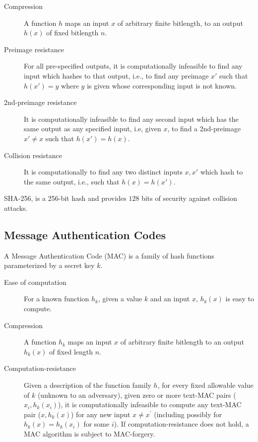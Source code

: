 \documentclass[%
  slidesonly,%
  semlayer%
  ]{seminar}                                  %
\begin{document}
\begin{slide}
    \begin{description}
      \item [Compression] A function $h$ maps an input $x$ of arbitrary finite bitlength, to an output $h(x)$ of fixed bitlength $n$.
      \item [Preimage resistance] For all pre-specified outputs, it is computationally infeasible to find any input which hashes to that output, i.e., to find any preimage $x'$ such that $h(x') = y$ where $y$ is given whose corresponding input is not known.
      \item [2nd-preimage resistance] It is computationally infeasible to find any second input which has the same output as any specified input, i.e, given $x$, to find a 2nd-preimage $x' \neq x$ such that $h(x') = h(x)$.
      \item [Collision resistance] It is computationally to find any two distinct inputs $x,x'$ which hash to the same output, i.e., such that $h(x) = h(x')$.
    \end{description}
    SHA-256, is a 256-bit hash and provides $128$ bits of security against collision attacks.
    \vfill
    \clearpage

  \subsection*{Message Authentication Codes}
    \vfill
    A Message Authentication Code (MAC) is a family of hash functions parameterized by a secret key $k$.

    \begin{description}
      \item [Ease of computation] For a known function $h_{k}$, given a value $k$
      and an input $x$, $h_{k}(x)$ is easy to compute.
      \item [Compression] A function $h_{k}$ maps an input $x$ of arbitrary finite bitlength to an output $h_{k}(x)$ of fixed length $n$.  
      \item [Computation-resistance] Given a description of the function family $h$, for every fixed allowable value of $k$ (unknown to an adversary), given zero or more text-MAC pairs ($x_{i}, h_{k}(x_{i})$), it is computationally infeasible to compute any text-MAC pair ($x,h_{k}(x)$) for any new input $x \neq x^{'}$ (including possibly for $h_{k}(x) = h_{k}(x_{i})$ for some $i$). 
      If computation-resistance does not hold, a MAC algorithm is subject to MAC-forgery.
    \end{description}
    \vfill
    \clearpage


\end{slide}
\end{document}
